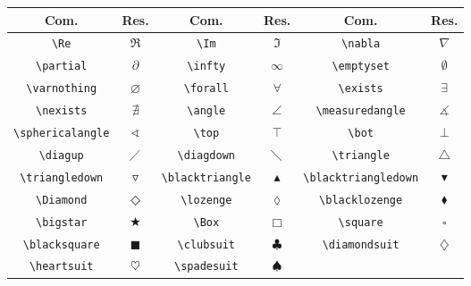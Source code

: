 % 
% 
% 
% 
% 
\begin{tabular}{cc|cc|cc}
    \hline
    Com. & Res. & Com. & Res. & Com. & Res. \\ \hline
    \lstinline!\Re! & $\Re$ & \lstinline!\Im! & $\Im$ & \lstinline!\nabla! & $\nabla$ \\
    \lstinline!\partial! & $\partial$ & \lstinline!\infty! & $\infty$ & \lstinline!\emptyset! & $\emptyset$ \\
    \lstinline!\varnothing! & $\varnothing$ & \lstinline!\forall! & $\forall$ & \lstinline!\exists! & $\exists$ \\
    \lstinline!\nexists! & $\nexists$ & \lstinline!\angle! & $\angle$ & \lstinline!\measuredangle! & $\measuredangle$ \\
    \lstinline!\sphericalangle! & $\sphericalangle$ & \lstinline!\top! & $\top$ & \lstinline!\bot! & $\bot$ \\
    \lstinline!\diagup! & $\diagup$ & \lstinline!\diagdown! & $\diagdown$ & \lstinline!\triangle! & $\triangle$ \\
    \lstinline!\triangledown! & $\triangledown$ & \lstinline!\blacktriangle! & $\blacktriangle$ & \lstinline!\blacktriangledown! & $\blacktriangledown$ \\
    \lstinline!\Diamond! & $\Diamond$ & \lstinline!\lozenge! & $\lozenge$ & \lstinline!\blacklozenge! & $\blacklozenge$ \\
    \lstinline!\bigstar! & $\bigstar$ & \lstinline!\Box! & $\Box$ & \lstinline!\square! & $\square$ \\
    \lstinline!\blacksquare! & $\blacksquare$ & \lstinline!\clubsuit! & $\clubsuit$ & \lstinline!\diamondsuit! & $\diamondsuit$ \\
    \lstinline!\heartsuit! & $\heartsuit$ & \lstinline!\spadesuit! & $\spadesuit$ \\ \hline
\end{tabular}
